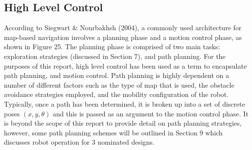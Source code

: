 \documentclass[a4paper]{article}
\begin{document}
\subsection{High Level Control}
According to  Siegwart \& Nourbakhsh (2004), a commonly used architecture for map-based navigation involves a planning phase and a motion control phase, as shown in Figure 25. The planning phase is comprised of two main tasks: exploration strategies (discussed in Section 7), and path planning. For the purposes of this report, high level control has been used as a term to encapsulate path planning, and motion control. Path planning is highly dependent on a number of different factors such as the type of map that is used, the obstacle avoidance strategies employed, and the mobility configuration of the robot. Typically, once a path has been determined, it is broken up into a set of discrete poses $(x,y,\theta)$ and this is passed as an argument to the motion control phase. It is beyond the scope of this report to provide detail on path planning strategies, however, some path planning schemes will be outlined in Section 9 which discusses robot operation for 3 nominated designs.\\
\end{document}
